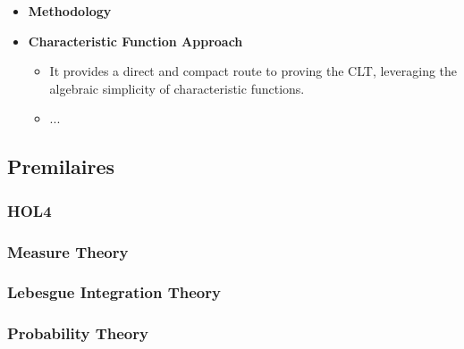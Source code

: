 \begin{itemize}
    \item \textbf{Methodology}
    \item \textbf{Characteristic Function Approach}
    \begin{itemize}
        \item It provides a direct and compact route to proving the CLT, leveraging the algebraic simplicity of characteristic functions.
        \item ...
    \end{itemize}
\end{itemize}

\subsection{Premilaires}
\subsubsection{HOL4}
\cite{tian2022assumption}
\subsubsection{Measure Theory}
\cite{qasim2016formalization}
\subsubsection{Lebesgue Integration Theory}
\cite{qasim2016formalization}
\subsubsection{Probability Theory}
\cite{qasim2016formalization}

